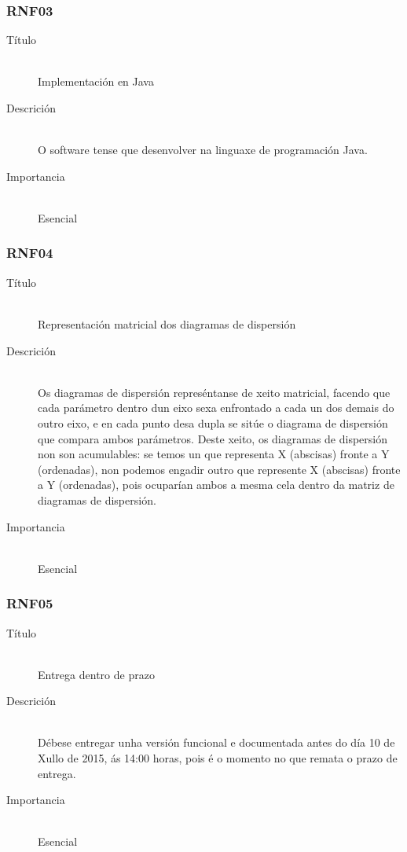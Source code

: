 \subsubsection*{RNF03}
\begin{description}
\item[Título] \hfill \\
Implementación en Java
\item[Descrición] \hfill \\
O software tense que desenvolver na linguaxe de programación Java.
\item[Importancia] \hfill \\
Esencial
\end{description}

\subsubsection*{RNF04}
\begin{description}
\item[Título] \hfill \\
Representación matricial dos diagramas de dispersión
\item[Descrición] \hfill \\
Os diagramas de dispersión represéntanse de xeito matricial, facendo que cada parámetro dentro dun eixo sexa enfrontado a cada un dos demais do outro eixo, e en cada punto desa dupla se sitúe o diagrama de dispersión que compara ambos parámetros. Deste xeito, os diagramas de dispersión non son acumulables: se temos un que representa X (abscisas) fronte a Y (ordenadas), non podemos engadir outro que represente X (abscisas) fronte a Y (ordenadas), pois ocuparían ambos a mesma cela dentro da matriz de diagramas de dispersión.
\item[Importancia] \hfill \\
Esencial
\end{description}

\subsubsection*{RNF05}
\begin{description}
\item[Título] \hfill \\
Entrega dentro de prazo
\item[Descrición] \hfill \\
Débese entregar unha versión funcional e documentada antes do día 10 de Xullo de 2015, ás 14:00 horas, pois é o momento no que remata o prazo de entrega.
\item[Importancia] \hfill \\
Esencial
\end{description}

